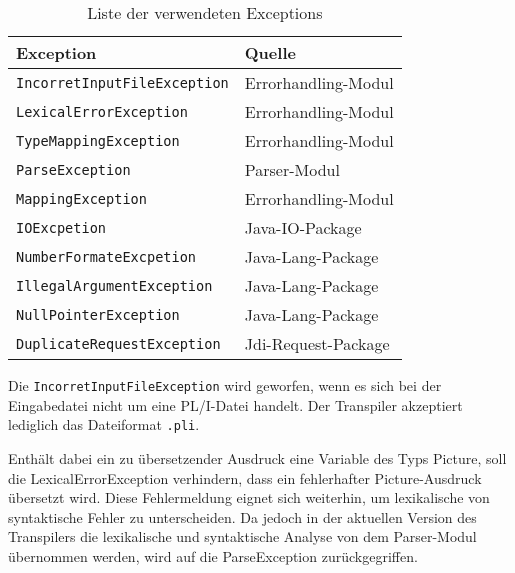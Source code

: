 \begin{table}[h]
	\centering
	
	\begin{tabularx}{\textwidth}{|X|X|}
		\hline
		\textbf{Exception} & \textbf{Quelle}  \\
		\hline
		\verb+IncorretInputFileException+ & Errorhandling-Modul  \\
		
		\verb+LexicalErrorException+ & Errorhandling-Modul  \\
		
		\verb+TypeMappingException+ & Errorhandling-Modul \\
		
		\verb+ParseException+ & Parser-Modul \\
		
		\verb+MappingException+ & Errorhandling-Modul \\
		
		\verb+IOExcpetion+ & Java-IO-Package \\
		
		\verb+NumberFormateExcpetion+ & Java-Lang-Package \\
		
		\verb+IllegalArgumentException+ & Java-Lang-Package \\
		
		\verb+NullPointerException+ & Java-Lang-Package \\
		
		\verb+DuplicateRequestException+ & Jdi-Request-Package \\
		\hline
		
	\end{tabularx}
	
	\caption{Liste der verwendeten Exceptions \label{tab:exceptiontabel}}
\end{table}
Die \verb+IncorretInputFileException+ wird geworfen, wenn
es sich bei der Eingabedatei nicht um eine PL/I-Datei handelt.
Der Transpiler akzeptiert lediglich das Dateiformat \verb+.pli+.

Enthält dabei ein zu übersetzender Ausdruck eine Variable des Typs Picture, soll die LexicalErrorException verhindern, dass ein fehlerhafter Picture-Ausdruck übersetzt wird.
Diese Fehlermeldung eignet sich weiterhin, um lexikalische von syntaktische Fehler zu unterscheiden. Da jedoch in der aktuellen Version des Transpilers die lexikalische und syntaktische Analyse von dem Parser-Modul übernommen werden, wird auf die ParseException zurückgegriffen.

